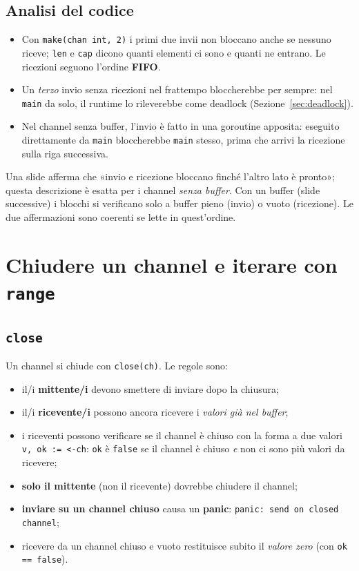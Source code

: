 \documentclass[11pt,a4paper]{report}
\newcommand{\cod}[1]{\texttt{#1}}
\begin{document}
\subsection{Analisi del codice}

\begin{itemize}
  \item Con \cod{make(chan int, 2)} i primi due invii non bloccano anche se
        nessuno riceve; \cod{len} e \cod{cap} dicono quanti elementi ci sono e
        quanti ne entrano. Le ricezioni seguono l'ordine \textbf{FIFO}.
  \item Un \emph{terzo} invio senza ricezioni nel frattempo bloccherebbe per
        sempre: nel \cod{main} da solo, il runtime lo rileverebbe come deadlock
        (Sezione~\ref{sec:deadlock}).
  \item Nel channel senza buffer, l'invio è fatto in una goroutine apposita:
        eseguito direttamente da \cod{main} bloccherebbe \cod{main} stesso, prima
        che arrivi la ricezione sulla riga successiva.
\end{itemize}

\begin{nota}
Una slide afferma che «invio e ricezione bloccano finché l'altro lato è pronto»;
questa descrizione è esatta per i channel \emph{senza buffer}. Con un buffer
(slide successive) i blocchi si verificano solo a buffer pieno (invio) o vuoto
(ricezione). Le due affermazioni sono coerenti se lette in quest'ordine.
\end{nota}

\section{Chiudere un channel e iterare con \texttt{range}}\label{sec:close}

\subsection{\texttt{close}}

Un channel si chiude con \cod{close(ch)}. Le regole sono:

\begin{itemize}
  \item il/i \textbf{mittente/i} devono smettere di inviare dopo la chiusura;
  \item il/i \textbf{ricevente/i} possono ancora ricevere i \emph{valori già nel
        buffer};
  \item i riceventi possono verificare se il channel è chiuso con la forma a due
        valori \cod{v, ok := <-ch}: \cod{ok} è \cod{false} se il channel è chiuso
        \emph{e} non ci sono più valori da ricevere;
  \item \textbf{solo il mittente} (non il ricevente) dovrebbe chiudere il
        channel;
  \item \textbf{inviare su un channel chiuso} causa un \textbf{panic}:
        \texttt{panic: send on closed channel};
  \item ricevere da un channel chiuso e vuoto restituisce subito il \emph{valore
        zero} (con \cod{ok == false}).
\end{itemize}
\end{document}
